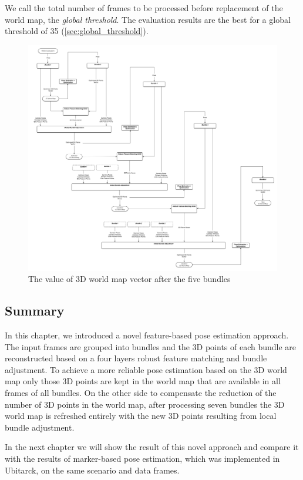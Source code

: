 We call the total number of frames to be processed before replacement of the world map, the \textit{global threshold}. The evaluation results are the best for a global threshold of 35 (\autoref{sec:global_threshold}).

\begin{figure}[H]
  \centering
  \includegraphics[width=150mm]{figures/mapping}
  \caption{The value of 3D world map vector after the five bundles}\label{fig:mapping_concept}
\end{figure}

\subsection{Summary} \label{subsec:summary}

In this chapter, we introduced a novel feature-based pose estimation approach. The input frames are grouped into bundles and the 3D points of each bundle are reconstructed based on a four layers robust feature matching and bundle adjustment. To achieve a more reliable pose estimation based on the 3D world map only those 3D points are kept in the world map that are available in all frames of all bundles. On the other side to compensate the reduction of the number of 3D points in the world map, after processing seven bundles the 3D world map is refreshed entirely with the new 3D points resulting from local bundle adjustment. 


In the next chapter we will show the result of this novel approach and compare it with the results of marker-based pose estimation, which was implemented in Ubitarck, on the same scenario and data frames.
